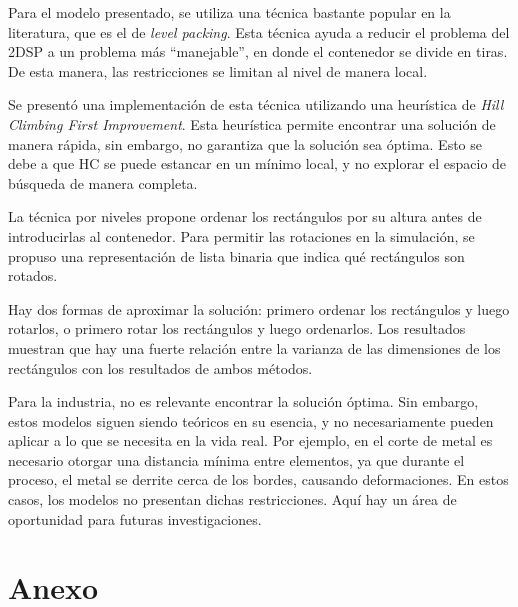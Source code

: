 \documentclass[letter, 10pt]{article}
\begin{document}
Para el modelo presentado, se utiliza una técnica bastante popular en la literatura, que es el de \textit{level packing}. Esta técnica ayuda a reducir el problema del 2DSP a un problema más ``manejable'', en donde el contenedor se divide en tiras. De esta manera, las restricciones se limitan al nivel de manera local.

Se presentó una implementación de esta técnica utilizando una heurística de \textit{Hill Climbing First Improvement}. Esta heurística permite encontrar una solución de manera rápida, sin embargo, no garantiza que la solución sea óptima. Esto se debe a que HC se puede estancar en un mínimo local, y no explorar el espacio de búsqueda de manera completa.

La técnica por niveles propone ordenar los rectángulos por su altura antes de introducirlas al contenedor. Para permitir las rotaciones en la simulación, se propuso una representación de lista binaria que indica qué rectángulos son rotados.

Hay dos formas de aproximar la solución: primero ordenar los rectángulos y luego rotarlos, o primero rotar los rectángulos y luego ordenarlos. Los resultados muestran que hay una fuerte relación entre la varianza de las dimensiones de los rectángulos con los resultados de ambos métodos.

Para la industria, no es relevante encontrar la solución óptima. Sin embargo, estos modelos siguen siendo teóricos en su esencia, y no necesariamente pueden aplicar a lo que se necesita en la vida real. Por ejemplo, en el corte de metal es necesario otorgar una distancia mínima entre elementos, ya que durante el proceso, el metal se derrite cerca de los bordes, causando deformaciones. En estos casos, los modelos no presentan dichas restricciones. Aquí hay un área de oportunidad para futuras investigaciones.





\appendix
\newpage
\section*{Anexo}
\end{document}
